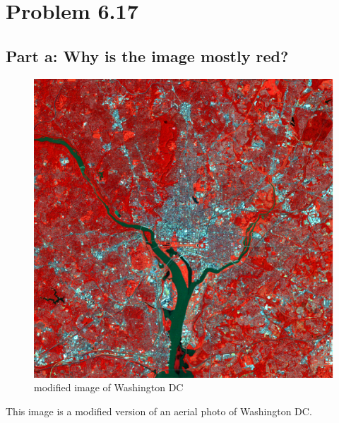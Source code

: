 \documentclass{article}
\begin{document}
	\newpage
	\section{Problem 6.17}
	
	\subsection{Part a: Why is the image mostly red?}
	
	\begin{figure}[H]
		\includegraphics[width=\linewidth]{6.17/partA/washingtonDCREDinfra.png}
		\caption{modified image of Washington DC}
	\end{figure}
	
	This image is a modified version of an aerial photo of Washington DC.
	
\end{document}
